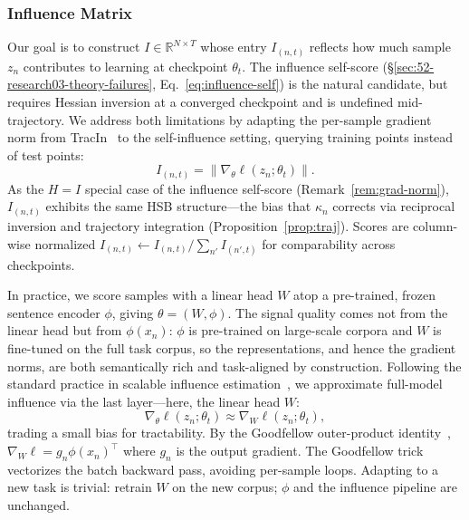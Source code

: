 \documentclass[12pt, a4paper, twoside]{book}
\numberwithin{equation}{chapter}
\theoremstyle{plain}
\theoremstyle{definition}
\theoremstyle{remark}
\newenvironment{foldable}{}{}
\begin{document}
\subsubsection{Influence Matrix} \label{sec:53-research03-method-gradient-influence}
\begin{foldable} Our goal is to construct $I \in \mathbb{R}^{N \times T}$ whose entry $I_{(n,t)}$ reflects how much sample $z_n$ contributes to learning at checkpoint $\theta_t$.
  The influence self-score (\S\ref{sec:52-research03-theory-failures}, Eq.~\ref{eq:influence-self}) is the natural candidate, but requires Hessian inversion at a converged checkpoint and is undefined mid-trajectory.
  We address both limitations by adapting the per-sample gradient norm from TracIn~\cite{pruthi2020estimating} to the self-influence setting, querying training points instead of test points:
  \begin{equation}
    I_{(n,t)} = \|\nabla_\theta \ell(z_n; \theta_t)\|.
    \label{eq:influence-matrix}
  \end{equation}
  As the $H=I$ special case of the influence self-score (Remark~\ref{rem:grad-norm}), $I_{(n,t)}$ exhibits the same \ac{HSB} structure---the bias that $\kappa_n$ corrects via reciprocal inversion and trajectory integration (Proposition~\ref{prop:traj}).
  Scores are column-wise normalized $I_{(n,t)} \leftarrow I_{(n,t)} / \sum_{n'} I_{(n',t)}$ for comparability across checkpoints.
\end{foldable}

\begin{foldable} 
  In practice, we score samples with a linear head $W$ atop a pre-trained, frozen sentence encoder $\phi$, giving $\theta = (W, \phi)$.
  The signal quality comes not from the linear head but from $\phi(x_n)$: $\phi$ is pre-trained on large-scale corpora and $W$ is fine-tuned on the full task corpus, so the representations, and hence the gradient norms, are both semantically rich and task-aligned by construction.
  Following the standard practice in scalable influence estimation~\cite{guo2021fastif}, we approximate full-model influence via the last layer---here, the linear head $W$:
  \begin{equation}
    \nabla_\theta \ell(z_n; \theta_t) \approx \nabla_W \ell(z_n; \theta_t),
    \label{eq:last-layer}
  \end{equation}
  trading a small bias for tractability.
  By the Goodfellow outer-product identity~\cite{goodfellow2015efficient}, $\nabla_W \ell = g_n \phi(x_n)^\top$ where $g_n$ is the output gradient.
  The Goodfellow trick vectorizes the batch backward pass, avoiding per-sample loops.
  Adapting to a new task is trivial: retrain $W$ on the new corpus; $\phi$ and the influence pipeline are unchanged.
\end{foldable}
\end{document}
